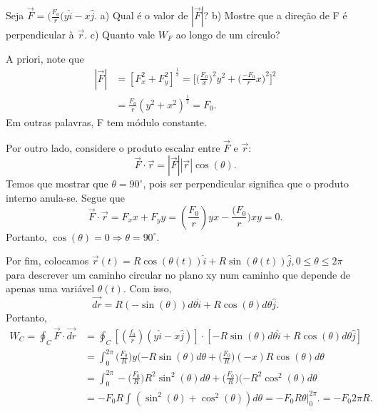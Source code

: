 \documentclass[PhysicsI/physics_notes.tex]{subfiles}
\begin{document}
\begin{example}
	Seja \(\vec{F} = (\frac{F_{0}}{r}(y\hat{i}-x\hat{j}\). a) Qual é o valor de \(|\vec{F}|\)? b) Mostre que a direção de F é perpendicular à \(\vec{r}\).
	c) Quanto vale \(W_{F}\) ao longo de um círculo?

	A priori, note que
	\begin{align*}
		|\vec{F}| & = [F_{x}^{2} + F_{y}^{2}]^{\frac{1}{2}} = \biggl[\biggl(\frac{F_{0}}{x}\biggr)^{2}y^{2} + \biggl(\frac{-F_{0}}{r}x\biggr)^{2}\biggr]^{2} \\
		          & = \frac{F_{0}}{r}(y^{2}+x^{2})^{\frac{1}{2}} = F_{0}.
	\end{align*}
	Em outras palavras, F tem módulo constante.

	Por outro lado, considere o produto escalar entre \(\vec{F}\) e \(\vec{r}\):
	\[
		\vec{F}\cdot \vec{r} = |\vec{F}||\vec{r}|\cos{(\theta )}.
	\]
	Temos que mostrar que \(\theta = 90^{\circ}\), pois ser perpendicular significa que o produto interno anula-se. Segue que
	\[
		\vec{F}\cdot \vec{r} = F_{x}x + F_{y}y = (\frac{F_{0}}{r})yx - \frac{(F_{0}}{r})xy = 0.
	\]
	Portanto, \(\cos{(\theta )} = 0 \Rightarrow \theta =90^{\circ}\).

	Por fim, colocamos \(\vec{r}(t) = R\cos{(\theta (t))}\hat{i} + R\sin{(\theta (t))}\hat{j}, 0\leq \theta \leq 2\pi \) para descrever um caminho circular
	no plano xy num caminho que depende de apenas uma variável \(\theta (t)\). Com isso,
	\[
		\vec{dr} = R(-\sin{(\theta )})d\theta \hat{i} + R\cos{(\theta )}d\theta \hat{j}.
	\]
	Portanto,
	\begin{align*}
		W_{C} = \oint_{C}\vec{F}\cdot \vec{dr} & = \oint_{C}[(\frac{f_{0}}{r})(y\hat{i}-x\hat{j})]\cdot [-R\sin{(\theta )}d\theta \hat{i} + R\cos{(\theta )}d\theta \hat{j}]                       \\
		                                       & = \int_{0}^{2\pi }\biggl(\frac{F_{0}}{R}\biggr)y(-R\sin{(\theta )d\theta } + \biggl(\frac{F_{0}}{R}\biggr)(-x)R\cos{(\theta )}d\theta             \\
		                                       & = \int_{0}^{2\pi }-\biggl(\frac{F_{0}}{R}\biggr)R^{2}\sin^{2}{(\theta )}d\theta  + \biggl(\frac{F_{0}}{R}\biggr)(-R^{2}\cos^{2}{(\theta )}d\theta \\
		                                       & = -F_{0}R \int_{}^{}(\sin^{2}{(\theta )} + \cos^{2}{(\theta )})d\theta  = -F_{0}R\theta \biggl|_{0}^{2\pi }\biggr. = -F_{0}2\pi R.
	\end{align*}
\end{example}
\end{document}
